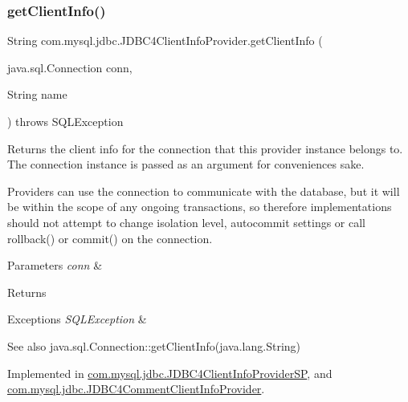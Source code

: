 \subsubsection{\texorpdfstring{get\+Client\+Info()}{getClientInfo()}\hspace{0.1cm}{\footnotesize\ttfamily [2/2]}}
{\footnotesize\ttfamily String com.\+mysql.\+jdbc.\+J\+D\+B\+C4\+Client\+Info\+Provider.\+get\+Client\+Info (\begin{DoxyParamCaption}\item[{java.\+sql.\+Connection}]{conn,  }\item[{String}]{name }\end{DoxyParamCaption}) throws S\+Q\+L\+Exception}

Returns the client info for the connection that this provider instance belongs to. The connection instance is passed as an argument for convenience\textquotesingle{}s sake.

Providers can use the connection to communicate with the database, but it will be within the scope of any ongoing transactions, so therefore implementations should not attempt to change isolation level, autocommit settings or call rollback() or commit() on the connection.


\begin{DoxyParams}{Parameters}
{\em conn} & \\
\hline
\end{DoxyParams}
\begin{DoxyReturn}{Returns}

\end{DoxyReturn}

\begin{DoxyExceptions}{Exceptions}
{\em S\+Q\+L\+Exception} & \\
\hline
\end{DoxyExceptions}
\begin{DoxySeeAlso}{See also}
java.\+sql.\+Connection\+::get\+Client\+Info(java.\+lang.\+String) 
\end{DoxySeeAlso}


Implemented in \mbox{\hyperlink{classcom_1_1mysql_1_1jdbc_1_1_j_d_b_c4_client_info_provider_s_p_a0b8221fb4e29722d7570124d595944fd}{com.\+mysql.\+jdbc.\+J\+D\+B\+C4\+Client\+Info\+Provider\+SP}}, and \mbox{\hyperlink{classcom_1_1mysql_1_1jdbc_1_1_j_d_b_c4_comment_client_info_provider_ad85c93d4ed96cddff56207a7e315ba93}{com.\+mysql.\+jdbc.\+J\+D\+B\+C4\+Comment\+Client\+Info\+Provider}}.

\mbox{\label{interfacecom_1_1mysql_1_1jdbc_1_1_j_d_b_c4_client_info_provider_a6101402e08a2e2062be166fce41ffd71}} 
